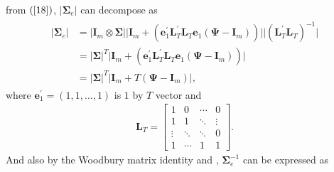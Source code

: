 \documentclass[12pt,a4paper,hyperref]{article}
\begin{document}
from $(\ref{18})$, $\vert \boldsymbol{\Sigma}_{e}   \vert$ can decompose as
\begin{align}
\begin{split}
\vert \boldsymbol{\Sigma}_{e}   \vert&= \vert \boldsymbol{I}_{m}\otimes \boldsymbol{\Sigma}  \vert \vert  \boldsymbol{I}_{m}+\left( \boldsymbol{e}^{'}_{1}\boldsymbol{L}^{'}_{T}\boldsymbol{L}_{T}\boldsymbol{e}_{1}(\boldsymbol{\Psi}-\boldsymbol{I}_{m}) \right) \vert \vert \left(\boldsymbol{L}^{'}_{T}\boldsymbol{L}_{T}  \right)^{-1}   \vert \\
&=\vert \boldsymbol{\Sigma}  \vert^{T}\vert  \boldsymbol{I}_{m}+\left( \boldsymbol{e}^{'}_{1}\boldsymbol{L}^{'}_{T}\boldsymbol{L}_{T}\boldsymbol{e}_{1}(\boldsymbol{\Psi}-\boldsymbol{I}_{m}) \right)  \vert  \\
&=\vert \boldsymbol{\Sigma}  \vert^{T}  \vert \boldsymbol{I}_{m}+T(\boldsymbol{\Psi}-\boldsymbol{I}_{m})     \vert,
\end{split}
\end{align}
where $\boldsymbol{e}^{'}_{1}=(1,1,\ldots, 1)$ is $1$ by $T$ vector and
\begin{align}
\boldsymbol{L}_{T}=
\begin{bmatrix}
1 & 0 & \cdots  & 0 \\
1 & 1 & \ddots &  \vdots \\
 \vdots & \ddots  & \ddots & 0  \\
1 & \cdots  & 1 &1
\end{bmatrix}.
\end{align}
And also by the Woodbury matrix identity and \citet{Juodis:2017}, $\boldsymbol{\Sigma}^{-1}_{e}$ can be expressed as
\end{document}

